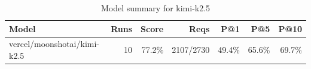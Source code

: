 \begin{table}[htbp]
\centering
\begin{tabular}{lrrrrrr}
\toprule
Model & Runs & Score & Reqs & P@1 & P@5 & P@10 \\
\midrule
vercel/moonshotai/kimi-k2.5 & 10 & 77.2\% & 2107/2730 & 49.4\% & 65.6\% & 69.7\% \\
\bottomrule
\end{tabular}
\caption{Model summary for kimi-k2.5}
\end{table}
